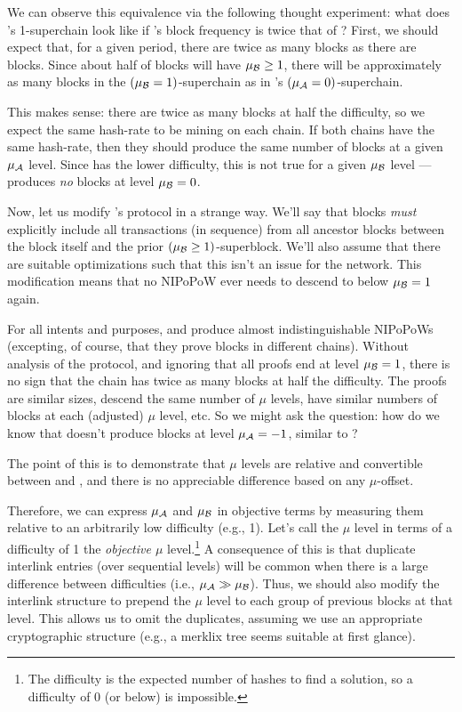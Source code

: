 We can observe this equivalence via the following thought experiment: what does \tradB's 1-superchain look like if \tradB's block frequency is twice that of \tradA?
First, we should expect that, for a given period, there are twice as many \tradB blocks as there are \tradA blocks.
Since about half of \tradB blocks will have $\mu_{\tradB} \ge 1$, there will be approximately as many \tradB blocks in the $(\mu_{\tradB}=1)$-superchain as in \tradA's $(\mu_{\tradA}=0)$-superchain.

This makes sense: there are twice as many blocks at half the difficulty, so we expect the same hash-rate to be mining on each chain.
If both chains have the same hash-rate, then they should produce the same number of blocks at a given $\mu_{\tradA}$ level.
Since \tradB has the lower difficulty, this is not true for a given $\mu_{\tradB}$ level --- \tradA produces \emph{no} blocks at level $\mu_{\tradB}=0$.

Now, let us modify \tradB's protocol in a strange way.
We'll say that \tradB blocks \emph{must} explicitly include all transactions (in sequence) from all ancestor blocks between the block itself and the prior $(\mu_{\tradB} \ge 1)$-superblock.
We'll also assume that there are suitable optimizations such that this isn't an issue for the \tradB network.
This modification means that no \tradB NIPoPoW ever needs to descend to below $\mu_{\tradB}=1$ again.

For all intents and purposes, \tradA and \tradB produce almost indistinguishable NIPoPoWs (excepting, of course, that they prove blocks in different chains).
Without analysis of the \tradB protocol, and ignoring that all \tradB proofs end at level $\mu_{\tradB}=1$, there is no sign that the \tradB chain has twice as many blocks at half the difficulty.
The proofs are similar sizes, descend the same number of $\mu$ levels, have similar numbers of blocks at each (adjusted) $\mu$ level, etc.
So we might ask the question: how do we know that \tradA doesn't produce blocks at level $\mu_{\tradA}=-1$, similar to \tradB?

The point of this is to demonstrate that $\mu$ levels are relative and convertible between \tradA and \tradB, and there is no appreciable difference based on any $\mu$-offset.

Therefore, we can express $\mu_{\tradA}$ and $\mu_{\tradB}$ in objective terms by measuring them relative to an arbitrarily low difficulty (e.g., 1).
Let's call the $\mu$ level in terms of a difficulty of 1 the \emph{objective $\mu$} level.\footnote{
    The difficulty is the expected number of hashes to find a solution, so a difficulty of 0 (or below) is impossible.
}
A consequence of this is that duplicate interlink entries (over sequential levels) will be common when there is a large difference between difficulties (i.e., $\mu_{\tradA} \gg \mu_{\tradB}$).
Thus, we should also modify the interlink structure to prepend the $\mu$ level to each group of previous blocks at that level.
This allows us to omit the duplicates, assuming we use an appropriate cryptographic structure (e.g., a merklix tree seems suitable at first glance).

